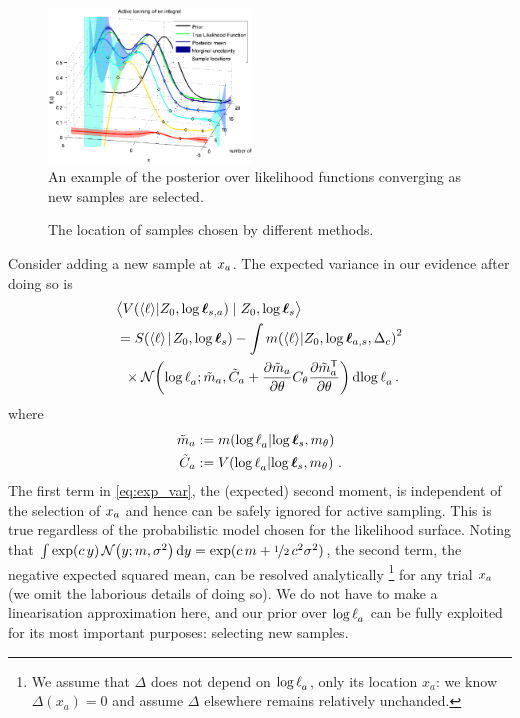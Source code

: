 \documentclass{article}
\begin{document}
\begin{figure}
\centering
\includegraphics[width=0.48\textwidth]{figures/active_learning.eps}
\caption{An example of the posterior over likelihood functions converging as new samples are selected.}
\label{fig:active_learning}
\end{figure}

\begin{figure}
\centering
{}
\caption{The location of samples chosen by different methods.}
\label{fig:sample_paths}
\end{figure}

Consider adding a new sample at $\lfv_a$. The expected variance in our evidence after doing so is
\begin{align}
&\bigl\langle \cov{\inty{\lfn}}{Z_0,\tvr_{s,a}}\mid Z_0,\tvr_{s}\bigr\rangle 
\nonumber\\
 & = \secm{\inty{\lfn}}{Z_0,\tvr_s} 
 - \int\mean{\inty{\lfn}}{Z_0,\tvr_{a,s},\Delta_c}^2\nonumber\\
& \hspace{0.2cm}
\times\N{\tr_a}
{\tilde{m}_a }
{\tilde{C}_a +\pderiv{\tilde{m}_a}{\theta}C_\theta\pderiv{\tilde{m}\tra_a}{\theta}}
\ud\tr_a\,.\label{eq:exp_var}
\end{align}
where
\begin{align*}
\tilde{m}_a & \deq \mean{\tr_a}{\tvr_s,m_\theta}\\
\tilde{C}_a & \deq \cov{\tr_a}{\tvr_s,m_\theta}\,.
\end{align*}
The first term in \eqref{eq:exp_var}, the (expected) second moment, is independent of the selection of $\lfv_a$ and hence can be safely ignored for active sampling. This is true regardless of the probabilistic model chosen for the likelihood surface. 
Noting that $\int \exp(c\, y)\, \N{y}{m}{\sigma^2} \ud y = \exp(c\, m + \nicefrac{1}{2}\, c^2 \sigma^2)$, 
the second term, the negative expected squared mean, can be resolved analytically
\footnote{We assume that $\Delta$ does not depend on $\tr_a$, only its location $x_a$: we know $\Delta(x_a) = 0$ and assume $\Delta$ elsewhere remains relatively unchanded.}
 for any trial $\lfv_a$ (we omit the laborious details of doing so). We do not have to make a linearisation approximation here, and our prior over $\tr_a$ can be fully exploited for its most important purposes: selecting new samples. 
\end{document}
